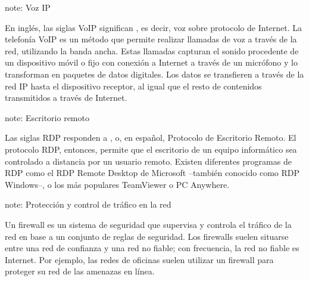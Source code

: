 \documentclass[letterpaper,10pt,spanish]{sphinxmanual}
\begin{document}
\begin{sphinxadmonition}{note}{: Voz IP}

\sphinxAtStartPar
En inglés, las siglas VoIP significan , es decir, voz sobre protocolo de Internet. La telefonía VoIP es un método que permite realizar llamadas de voz a través de la red, utilizando la banda ancha. Estas llamadas capturan el sonido procedente de un dispositivo móvil o fijo con conexión a Internet a través de un micrófono y lo transforman en paquetes de datos digitales. Los datos se transfieren a través de la red IP hasta el dispositivo receptor, al igual que el resto de contenidos transmitidos a través de Internet.
\end{sphinxadmonition}

\begin{sphinxadmonition}{note}{: Escritorio remoto}

\sphinxAtStartPar
Las siglas RDP responden a , o, en español, Protocolo de Escritorio Remoto. El protocolo RDP, entonces, permite que el escritorio de un equipo informático sea controlado a distancia por un usuario remoto. Existen diferentes programas de RDP como el RDP Remote Desktop de Microsoft –también conocido como RDP Windows–, o los más populares TeamViewer o PC Anywhere.
\end{sphinxadmonition}

\begin{sphinxadmonition}{note}{: Protección y control de tráfico en la red}

\sphinxAtStartPar
Un firewall es un sistema de seguridad que supervisa y controla el tráfico de la red en base a un conjunto de reglas de seguridad. Los firewalls suelen situarse entre una red de confianza y una red no fiable; con frecuencia, la red no fiable es Internet. Por ejemplo, las redes de oficinas suelen utilizar un firewall para proteger su red de las amenazas en línea.
\end{sphinxadmonition}
\end{document}
